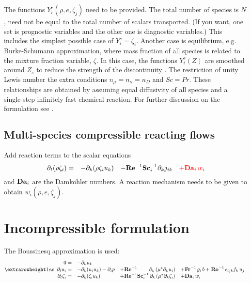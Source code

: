 The functions $Y_i^e(\rho,e,\zeta_j)$ need to be provided. The total number of
species is $N$, need not be equal to the total number of scalars
transported. (If you want, one set is prognostic variables and the other one is
diagnostic variables.) This includes the simplest possible case of $Y_i^e =
\zeta_i$. Another case is equilibrium, e.g. Burke-Schumann approximation, where
mass fraction of all species is related to the mixture fraction variable,
$\zeta$.  In this case, the functions $Y_i^e(Z)$ are smoothed around $Z_s$ to
reduce the strength of the discontinuity \citep{Higuera:1994}. The restriction
of unity Lewis number the extra conditions $n_\mu=n_\kappa=n_D$ and $Sc=Pr$.
These relationships are obtained by assuming equal diffusivity of all species
and a single-step infinitely fast chemical reaction.  For further discussion on
the formulation see \cite{Williams:1985}.

\subsection{Multi-species compressible reacting flows}

Add reaction terms to the scalar equations
\begin{equation}
\begin{array}{rlll}
  \partial_t (\rho \zeta_i)=&
  - \partial_k (\rho \zeta_i u_k) &
  - \mathrm{\bf Re}^{-1}\mathrm{\bf Sc}_i^{-1} \partial_k j_{ik} & \color{red}{+ \mathrm{\bf Da}_i\,w_i}
\end{array}
\end{equation}
and $\mathrm{\bf Da}_i$ are the Damk{\"o}hler numbers. A reaction mechanism
needs to be given to obtain $w_i(\rho,e,\zeta_j)$.

\section{Incompressible formulation}

The Boussinesq approximation is used:
\begin{equation}
\setlength{\extrarowheight}{1ex}
\begin{array}{rlll}
  0 =&
  -\partial_k u_k   & \\
  \partial_t  u_i =& 
  -\partial_k ( u_i u_k )-\partial_i p &
  +\mathrm{\bf Re}^{-1}\qquad\;\partial_k \left( \mu^{*} \partial_k u_i\right) &
  +\mathrm{\bf Fr}^{-1}\, g_i\,b+\mathrm{\bf Ro}^{-1}\,\epsilon_{ijk} f_k\,u_j  \\
  \partial_t \zeta_i =&
  -\partial_k (\zeta_i u_k) &
  + \mathrm{\bf Re}^{-1}\mathrm{\bf Sc}_i^{-1}\, \partial_k \left( \mu^{*}\partial_k\zeta_i\right) &+ \mathrm{\bf Da}_i\,w_i
\end{array}
\end{equation}

